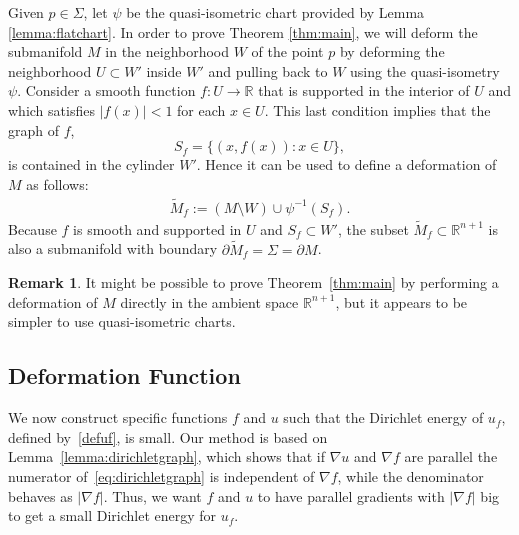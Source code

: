 \documentclass{CUP-JNL-FMP}%
\theoremstyle{definition}
\newtheorem{remark}[theorem]{Remark}
\numberwithin{equation}{section}
\begin{document}
Given $p\in\Sigma$, let $\psi$ be the quasi-isometric chart provided by Lemma \ref{lemma:flatchart}. In order to prove Theorem \ref{thm:main}, we will deform the submanifold $M$ in the neighborhood $W$ of the point $p$ by deforming the neighborhood $U\subset W'$ inside $W'$ and pulling back to $W$ using the quasi-isometry $\psi$.
Consider a smooth function $f\colon U\rightarrow\mathbb{R}$ that is supported in the interior of $U$ and which satisfies $|f(x)|<1$ for each $x\in U$. This last condition implies that the graph of $f$,
$$S_f = \{(x, f(x)) : x\in U\},
$$
is contained in the cylinder $W'$.
Hence it can be used to define a deformation of $M$ as follows:
\begin{gather}\label{def:TM}
\widetilde{M}_f:=(M\setminus W)\cup\psi^{-1}(S_f).
\end{gather}
Because $f$ is smooth and supported in $U$ and $S_f\subset W'$, the subset $\widetilde{M}_f\subset\mathbb{R}^{n+1}$ is also  a submanifold with boundary $\partial\widetilde{M}_f=\Sigma=\partial M$.
  \begin{remark}
    It might be possible to prove Theorem~\ref{thm:main} by performing a deformation of $M$ directly in the ambient space $\mathbb{R}^{n+1}$, but it appears to be simpler to use quasi-isometric charts.
  \end{remark}


\subsection{Deformation Function}

We now construct specific functions $f$ and $u$ such that the Dirichlet energy of $u_f$, defined by~\eqref{defuf}, is small. Our method is based on Lemma~\ref{lemma:dirichletgraph}, which shows that if $\nabla u$ and $\nabla f$ are parallel the numerator of~\eqref{eq:dirichletgraph} is independent of $\nabla f$, while the denominator behaves as $|\nabla f|$. Thus, we want $f$ and $u$
to have parallel gradients with $|\nabla f|$ big to get a small Dirichlet
energy for $u_f$.
\end{document}
